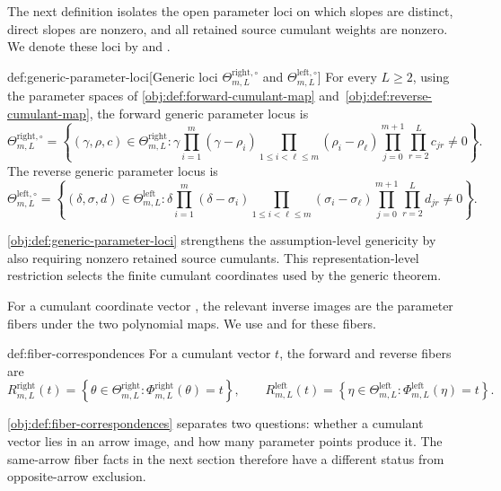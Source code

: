 \documentclass[11pt]{article}
\begin{document}
The next definition isolates the open parameter loci on which slopes are distinct, direct slopes are nonzero, and all retained source cumulant weights are nonzero. We denote these loci by  and .

\begin{definitionv}{def:generic-parameter-loci}[Generic loci \(\Theta^{\mathrm{right},\circ}_{m,L}\) and \(\Theta^{\mathrm{left},\circ}_{m,L}\)]
For every \(L\ge2\), using the parameter spaces of \cref{obj:def:forward-cumulant-map} and~\cref{obj:def:reverse-cumulant-map}, the forward generic parameter locus is
\[
\Theta^{\mathrm{right},\circ}_{m,L}
=
\left\{
(\gamma,\rho,c)\in \Theta^{\mathrm{right}}_{m,L}:
\gamma
\prod_{i=1}^m(\gamma-\rho_i)
\prod_{1\le i<\ell\le m}(\rho_i-\rho_\ell)
\prod_{j=0}^{m+1}\prod_{r=2}^L c_{jr}
\ne 0
\right\}.
\]
The reverse generic parameter locus is
\[
\Theta^{\mathrm{left},\circ}_{m,L}
=
\left\{
(\delta,\sigma,d)\in \Theta^{\mathrm{left}}_{m,L}:
\delta
\prod_{i=1}^m(\delta-\sigma_i)
\prod_{1\le i<\ell\le m}(\sigma_i-\sigma_\ell)
\prod_{j=0}^{m+1}\prod_{r=2}^L d_{jr}
\ne 0
\right\}.
\]
\end{definitionv}

\cref{obj:def:generic-parameter-loci} strengthens the assumption-level genericity by also requiring nonzero retained source cumulants. This representation-level restriction selects the finite cumulant coordinates used by the generic theorem.

For a cumulant coordinate vector , the relevant inverse images are the parameter fibers under the two polynomial maps. We use  and  for these fibers.

\begin{definitionv}{def:fiber-correspondences}
For a cumulant vector \(t\), the forward and reverse fibers are
\[
R^{\mathrm{right}}_{m,L}(t)
=
\left\{
\theta\in \Theta^{\mathrm{right}}_{m,L}:
\Phi^{\mathrm{right}}_{m,L}(\theta)=t
\right\},
\qquad
R^{\mathrm{left}}_{m,L}(t)
=
\left\{
\eta\in \Theta^{\mathrm{left}}_{m,L}:
\Phi^{\mathrm{left}}_{m,L}(\eta)=t
\right\}.
\]
\end{definitionv}

\cref{obj:def:fiber-correspondences} separates two questions: whether a cumulant vector lies in an arrow image, and how many parameter points produce it. The same-arrow fiber facts in the next section therefore have a different status from opposite-arrow exclusion.
\end{document}
